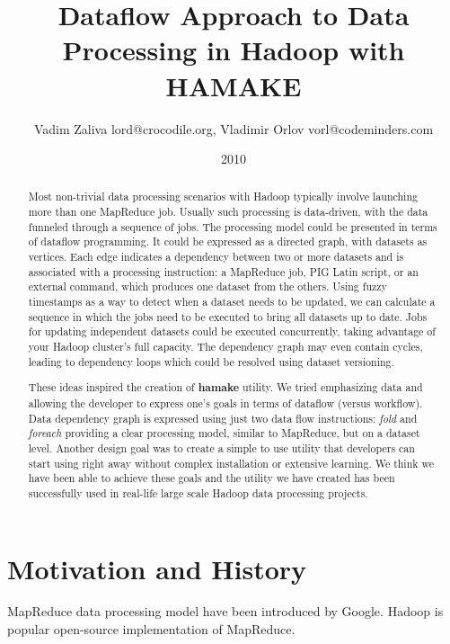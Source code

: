 \documentclass[10pt,conference,letterpaper]{IEEEtran}
\author{Vadim Zaliva lord@crocodile.org, Vladimir Orlov vorl@codeminders.com}
\date{2010}
\title{Dataflow Approach to Data Processing in Hadoop with HAMAKE}
\begin{document}
\lstset{language=XML,basicstyle=\tiny,markfirstintag=true,numbers=left, numberstyle=\tiny}

\maketitle

\begin{abstract}
  Most non-trivial data processing scenarios with Hadoop typically
  involve launching more than one MapReduce job. Usually such
  processing is data-driven, with the data funneled through a sequence
  of jobs. The processing model could be presented in terms of
  dataflow programming. It could be expressed as a directed graph,
  with datasets as vertices. Each edge indicates a dependency between
  two or more datasets and is associated with a processing
  instruction: a MapReduce job, PIG Latin script, or an external
  command, which produces one dataset from the others. Using fuzzy
  timestamps as a way to detect when a dataset needs to be updated, we
  can calculate a sequence in which the jobs need to be executed to
  bring all datasets up to date. Jobs for updating independent
  datasets could be executed concurrently, taking advantage of your
  Hadoop cluster's full capacity. The dependency graph may even
  contain cycles, leading to dependency loops which could be resolved
  using dataset versioning.

  These ideas inspired the creation of \textbf{hamake} utility. We
  tried emphasizing data and allowing the developer to express one's
  goals in terms of dataflow (versus workflow). Data dependency graph
  is expressed using just two data flow instructions: \emph{fold} and
  \emph{foreach} providing a clear processing model, similar to
  MapReduce, but on a dataset level. Another design goal was to create
  a simple to use utility that developers can start using right away
  without complex installation or extensive learning. We think we have
  been able to achieve these goals and the utility we have created has
  been successfully used in real-life large scale Hadoop data
  processing projects.
\end{abstract}

\section{Motivation and History}

MapReduce data processing model have been introduced by
Google\cite{dean2008map}. Hadoop\cite{bialecki2005hadoop} is popular
open-source implementation of MapReduce.
\end{document}
